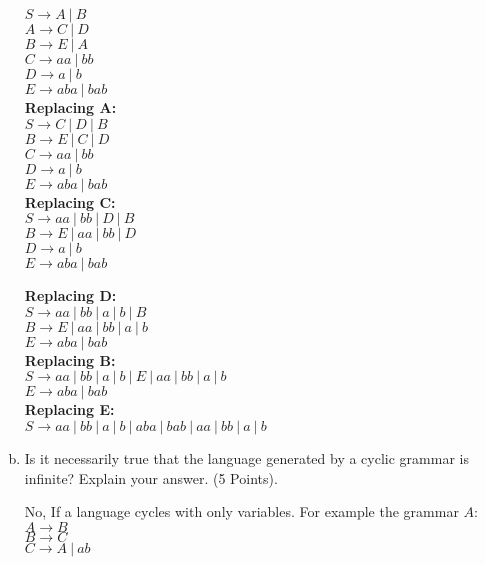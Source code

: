 \documentclass{article}
\begin{document}
\begin{enumerate}[(a)]
\begin{minipage}[c]{0.5\linewidth}
$S \rightarrow A\ |\ B$ \\
$A \rightarrow C\ |\ D$ \\
$B \rightarrow E\ |\ A$ \\
$C \rightarrow aa\ |\ bb$ \\
$D \rightarrow a\ |\ b$ \\
$E \rightarrow aba\ |\ bab$ \\
\textbf{Replacing A:}\\
$S \rightarrow C\ |\ D\ |\ B$ \\
$B \rightarrow E\ |\ C\ |\ D$ \\
$C \rightarrow aa\ |\ bb$ \\
$D \rightarrow a\ |\ b$ \\
$E \rightarrow aba\ |\ bab$ \\
\textbf{Replacing C:} \\
$S \rightarrow aa\ |\ bb\ |\ D\ |\ B$ \\
$B \rightarrow E\ |\ aa\ |\ bb\ |\ D$ \\
$D \rightarrow a\ |\ b$ \\
$E \rightarrow aba\ |\ bab$ \\
\end{minipage}
\begin{minipage}[c]{0.5\linewidth}
\textbf{Replacing D:} \\
$S \rightarrow aa\ |\ bb\ |\ a\ |\ b\ |\ B$ \\
$B \rightarrow E\ |\ aa\ |\ bb\ |\ a\ |\ b$ \\
$E \rightarrow aba\ |\ bab$ \\
\textbf{Replacing B:}\\
$S \rightarrow aa\ |\ bb\ |\ a\ |\ b\ |\ E\ |\ aa\ |\ bb\ |\ a\ |\ b$ \\
$E \rightarrow aba\ |\ bab$ \\
\textbf{Replacing E:}\\
$S \rightarrow aa\ |\ bb\ |\ a\ |\ b\ |\ aba\ |\ bab\ |\ aa\ |\ bb\ |\ a\ |\ b$ \\
\end{minipage}

\item Is it necessarily true that the language generated by a cyclic grammar is infinite? Explain your
answer. (5 Points).

No, If a language cycles with only variables. For example the grammar $A$: \\
$A \rightarrow B $ \\
$B \rightarrow C $ \\
$C \rightarrow A\ |\ ab$



\end{enumerate}
\end{document}
